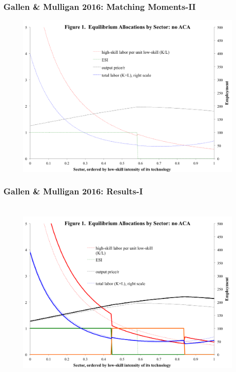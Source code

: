 \documentclass{beamer}
\begin{document}
\begin{frame}
\frametitle[alignment=center]{Gallen \& Mulligan 2016: Matching Moments-II}
\begin{figure}
\centering
\includegraphics[scale=0.42]{Figures/Fig2.png}
\end{figure}
\end{frame}

\begin{frame}
\frametitle[alignment=center]{Gallen \& Mulligan 2016: Results-I\ \\ \ }
\begin{figure}
\centering
\includegraphics[scale=0.42]{Figures/Fig3.png}
\end{figure}
\end{frame}
\end{document}
